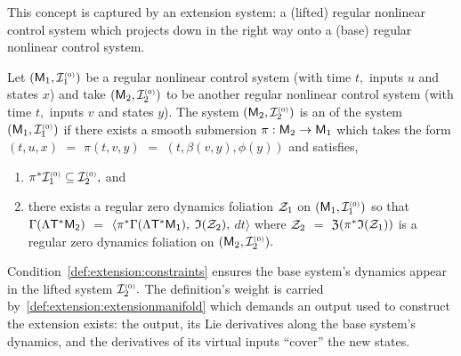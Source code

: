 \documentclass[a4paper]{ifacconf}
\begin{document}
%
This concept is captured by an extension system: a (lifted) regular nonlinear control system which projects down in the right way onto a (base) regular nonlinear control system.
%
\begin{defn}%
  \label{def:extension}
  Let \((\mathsf{M}_1, \mathcal{I}^{\smash{\scriptscriptstyle(0)}}_1)\) be a regular nonlinear control system (with time \(t,\) inputs \(u\) and states \(x\)) and take \((\mathsf{M}_2, \mathcal{I}^{\smash{\scriptscriptstyle(0)}}_2)\) to be another regular nonlinear control system (with time \(t,\) inputs \(v\) and states \(y\)).
  The system \((\mathsf{M}_2, \mathcal{I}^{\smash{\scriptscriptstyle(0)}}_2)\) is an  of the system \((\mathsf{M}_1, \mathcal{I}^{\smash{\scriptscriptstyle(0)}}_1)\) if there exists a smooth submersion \(\pi: \mathsf{M}_2 \to \mathsf{M}_1\) which takes the form 
  \(
    (t, u, x) 
  \)
  \(=\)
  \(\pi(t, v, y)\)
  \(=\)
  \((t, \beta(v, y), \phi(y))\)
  and satisfies,
  \begin{enumerate}[label={(\roman*)}]
    \item{
      \label{def:extension:constraints}
      \(\pi^* \mathcal{I}^{\smash{\scriptscriptstyle(0)}}_1 \subseteq \mathcal{I}^{\smash{\scriptscriptstyle(0)}}_2,\) and
    }
    \item{
      \label{def:extension:extensionmanifold}
      there exists a regular zero dynamics foliation \(\mathcal{Z}_1\) on \((\mathsf{M}_1, \mathcal{I}^{\smash{\scriptscriptstyle(0)}}_1)\) so that
      \(\Gamma(\Lambda\mathsf{T}^*\mathsf{\mathsf{M}_2})\) \(=\) \(\langle \pi^* \Gamma(\Lambda\mathsf{T}^*\mathsf{\mathsf{M}_1}),\) \(\mathfrak{I}(\mathcal{Z}_2),\) \(dt \rangle\)
      where \(\mathcal{Z}_2\) \(=\) \(\mathfrak{Z}(\pi^* \mathfrak{I}(\mathcal{Z}_1))\) is a regular zero dynamics foliation on \((\mathsf{M}_2, \mathcal{I}^{\smash{\scriptscriptstyle(0)}}_2).\)
    }
  \end{enumerate}
\end{defn}
%
Condition~\ref{def:extension:constraints} ensures the base system's dynamics appear in the lifted system \(\mathcal{I}^{\smash{\scriptscriptstyle(0)}}_2.\)
The definition's weight is carried by~\ref{def:extension:extensionmanifold} which demands an output used to construct the extension exists:
the output, its Lie derivatives along the base system's dynamics, and the derivatives of its virtual inputs ``cover'' the new states.
\end{document}
